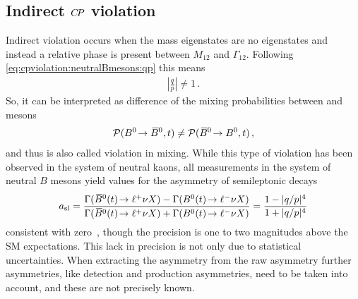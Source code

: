 
\subsection{Indirect \texorpdfstring{${C\!P}$}{CP} violation}
\label{sec:cpviolation:types:indirect}

Indirect \CP violation occurs when the mass eigenstates are no \CP eigenstates
and instead a relative phase is present between $M_{12}$ and $\Gamma_{12}$.
Following \cref{eq:cpviolation:neutralBmesons:qp} this means
\begin{align}
	\left|\frac qp \right| \neq 1\,.
\end{align}
So, it can be interpreted as difference of the mixing probabilities between
\Bd and \Bdb mesons
\begin{align}
	\mathcal{P}({{B}^0}\!\rightarrow{\ensuremath{{\kern 0.18em\overline{\kern -0.18em B}{}}{}^0}},t) \neq \mathcal{P}({{\kern 0.18em\overline{\kern -0.18em B}{}}{}^0}\!\rightarrow{\ensuremath{{B}^0}},t)\,,
\end{align}
and thus is also called \CP violation in mixing. While this type of \CP
violation has been observed in the system of neutral kaons, all measurements
in the system of neutral $B$ mesons yield values for the asymmetry of
semileptonic decays
\begin{align}
	a_{\mathrm{sl}} = \frac{\Gamma({{\kern 0.18em\overline{\kern -0.18em B}{}}{}^0}(t)\!\rightarrow{\ensuremath{\ell^+}}\nu X) - \Gamma({{B}^0}(t)\!\rightarrow{\ensuremath{\ell^-}}\nu X)}{\Gamma({{\kern 0.18em\overline{\kern -0.18em B}{}}{}^0}(t)\!\rightarrow{\ensuremath{\ell^+}}\nu X) + \Gamma({{B}^0}(t)\!\rightarrow{\ensuremath{\ell^-}}\nu X)} = \frac{1 - |q/p|^4}{1 + |q/p|^4}
\end{align}
consistent with zero~\cite{LHCb-PAPER-2014-053,LHCb-PAPER-2016-013}, though
the precision is one to two magnitudes above the SM expectations. This lack in
precision is not only due to statistical uncertainties. When extracting the
\CP asymmetry from the raw asymmetry further asymmetries, like detection and
production asymmetries, need to be taken into account, and these are not
precisely known.